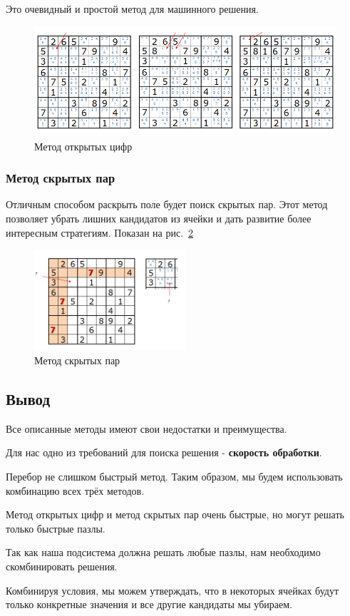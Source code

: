 Это очевидный и простой метод для машинного решения.

\begin{figure}[ht!]
 \centering 
 \includegraphics[width=\textwidth]{inc/raster/analysis1-7.png} 
 \caption{Метод открытых цифр} 
 \label{fig:fig07} 
\end{figure}


\subsubsection*{Метод скрытых пар}

Отличным способом раскрыть поле будет поиск скрытых пар. Этот метод позволяет убрать лишних кандидатов из ячейки и дать развитие более интересным стратегиям. Показан на рис.~\ref{fig:fig08}
\begin{figure}[ht!]
 \centering 
 \includegraphics[width=0.5\textwidth]{inc/raster/analysis1-8.png} 
 \caption{Метод скрытых пар} 
 \label{fig:fig08} 
\end{figure}

\subsection{Вывод}
Все описанные методы имеют свои недостатки и преимущества.

Для нас одно из требований для поиска решения - \textbf{скорость обработки}. 

Перебор не слишком быстрый метод. Таким образом, мы будем использовать комбинацию всех трёх методов.

Метод открытых цифр и метод скрытых пар очень быстрые, но могут решать только быстрые пазлы. 

Так как наша подсистема должна решать любые пазлы, нам необходимо скомбинировать решения.

Комбинируя  условия, мы можем утверждать, что в некоторых ячейках  будут только конкретные значения и все другие кандидаты мы убираем.

